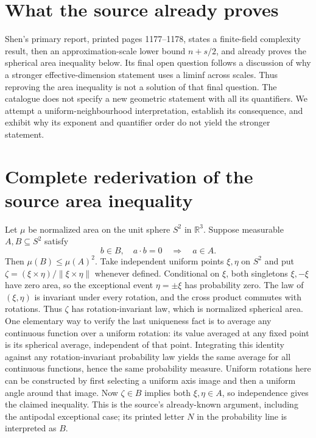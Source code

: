 \documentclass[11pt]{article}
\begin{document}
\section{What the source already proves}
Shen's primary report, printed pages 1177--1178, states a finite-field
complexity result, then an approximation-scale lower bound
$n+s/2$, and already proves the spherical area inequality below.
Its final open question follows a discussion of why a stronger
effective-dimension statement uses a liminf across scales. Thus
reproving the area inequality is not a solution of that final
question. The catalogue does not specify a new geometric statement
with all its quantifiers. We attempt a uniform-neighbourhood
interpretation, establish its consequence, and exhibit why its
exponent and quantifier order do not yield the stronger statement.

\section{Complete rederivation of the source area inequality}
Let $\mu$ be normalized area on the unit sphere $S^2$ in
$\mathbb R^3$. Suppose measurable $A,B\subseteq S^2$ satisfy
\[
 b\in B,\quad a\cdot b=0\quad\Longrightarrow\quad a\in A.
\]
Then $\mu(B)\le\mu(A)^2$. Take independent uniform points
$\xi,\eta$ on $S^2$ and put
$\zeta=(\xi\times\eta)/\|\xi\times\eta\|$ whenever defined.
Conditional on $\xi$, both singletons $\xi,-\xi$ have zero area,
so the exceptional event $\eta=\pm\xi$ has probability zero.
The law of $(\xi,\eta)$ is invariant under every rotation, and
the cross product commutes with rotations. Thus $\zeta$ has
rotation-invariant law, which is normalized spherical area.
One elementary way to verify the last uniqueness fact is to
average any continuous function over a uniform rotation: its
value averaged at any fixed point is its spherical average,
independent of that point. Integrating this identity against any
rotation-invariant probability law yields the same average for
all continuous functions, hence the same probability measure.
Uniform rotations here can be constructed by first selecting a
uniform axis image and then a uniform angle around that image.
Now $\zeta\in B$ implies both $\xi,\eta\in A$, so independence
gives the claimed inequality. This is the source's already-known
argument, including the antipodal exceptional case; its printed
letter $N$ in the probability line is interpreted as $B$.
\end{document}
